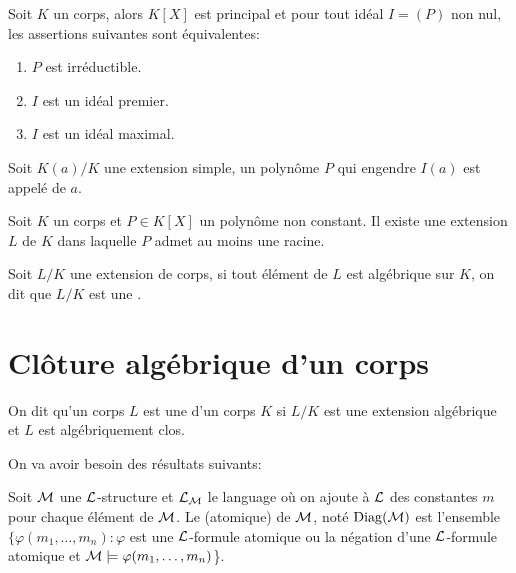 \begin{prop}\label{prop-KX-principal}
    Soit $K$ un corps, alors $K[X]$ est principal et pour tout idéal $I = (P)$ non nul, les assertions suivantes sont équivalentes:
    \begin{enumerate}[label= (\roman*)]
        \item $P$ est irréductible.
        \item $I$ est un idéal premier.
        \item $I$ est un idéal maximal.
    \end{enumerate}
\end{prop}

\begin{defi}
Soit $K(a)/K$ une extension simple, un polynôme $P$ qui engendre $I(a)$ est
appelé  de $a$.
\end{defi}

\begin{theo}\label{theo-corps-rupture}
    Soit $K$ un corps et $P \in K[X]$ un polynôme non constant.
    Il existe une extension $L$ de $K$ dans laquelle $P$ admet au moins une racine.
\end{theo}

\begin{defi}
Soit $L/K$ une extension de corps, si tout élément de $L$ est algébrique sur
$K$, on dit que $L/K$ est une .
\end{defi}

\section{Clôture algébrique d'un corps}

\begin{defi}
On dit qu'un corps $L$ est une 
d'un corps $K$ si $L/K$ est une extension algébrique et $L$ est algébriquement clos.
\end{defi}

On va avoir besoin des résultats suivants:

\begin{defi}\label{defi-diagramme}
    Soit $\mathcal{M}$ une $\mathcal{L}$-structure et $\mathcal{L}_{\mathcal{M}}$ le language où on ajoute à $\mathcal{L}$
    des constantes $m$ pour chaque élément de $\mathcal{M}$. Le  (atomique) de
    $\mathcal{M}$, noté  $\operatorname{Diag}(\mathcal{M})$ est l'ensemble $\{ \varphi(m_1, \ldots, m_n) :
    \varphi$  est une $\mathcal{L}$-formule atomique ou la négation d'une $\mathcal{L}$-formule
    atomique et $\mathcal{M} \models \varphi(m_1, \ldots, m_n)  $\}.

\end{defi}


